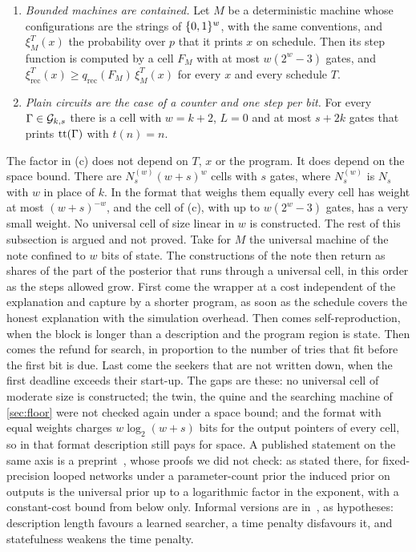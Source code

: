 \begin{proposition}
\begin{enumerate}[label=(\alph*),leftmargin=2em,itemsep=2pt,topsep=2pt]
$s\,T(n)$ on schedule, and it has the same weight for every schedule.
\item \emph{Bounded machines are contained.} Let $M$ be a deterministic machine whose configurations are the
strings of $\{0,1\}^w$, with the same conventions, and $\xi^T_M(x)$ the probability over $p$ that it prints $x$ on
schedule. Then its step function is computed by a cell $F_M$ with at most $w(2^w-3)$ gates, and
$\xi^T_{\mathrm{rec}}(x)\ge q_{\mathrm{rec}}(F_M)\,\xi^T_M(x)$ for every $x$ and every schedule $T$.
\item \emph{Plain circuits are the case of a counter and one step per bit.} For every $\Gamma\in\mathcal G_{k,s}$
there is a cell with $w=k+2$, $L=0$ and at most $s+2k$ gates that prints $\mathrm{tt}(\Gamma)$ with $t(n)=n$.
\end{enumerate}
\end{proposition}

The factor in (c) does not depend on $T$, $x$ or the program. It does depend on the space bound. There are
$N^{(w)}_s(w+s)^w$ cells with $s$ gates, where $N^{(w)}_s$ is $N_s$ with $w$ in place of $k$. In the format
that weighs them equally every cell has weight at most $(w+s)^{-w}$, and the cell of (c), with up to
$w(2^w-3)$ gates, has a very small weight. No universal cell of size linear in $w$ is constructed. The rest of
this subsection is argued and not proved. Take for $M$ the universal machine of the note confined to $w$ bits
of state. The constructions of the note then return as shares of the part of the posterior that runs through a
universal cell, in this order as the steps allowed grow. First come the wrapper at a cost independent of the
explanation and capture by a shorter program, as soon as the schedule covers the honest explanation with the
simulation overhead. Then comes self-reproduction, when the block is longer than a description and the program
region is state. Then comes the refund for search, in proportion to the number of tries that fit before the
first bit is due. Last come the seekers that are not written down, when the first deadline exceeds their
start-up. The gaps are these: no universal cell of moderate size is constructed; the twin, the quine and the
searching machine of \cref{sec:floor} were not checked again under a space bound; and the format with equal
weights charges $w\log_2(w+s)$ bits for the output pointers of every cell, so in that format description still
pays for space. A published statement on the same axis is a preprint~\cite{musat26}, whose proofs we did not
check: as stated there, for fixed-precision looped networks under a parameter-count prior the induced prior on
outputs is the universal prior up to a logarithmic factor in the exponent, with a constant-cost bound from
below only. Informal versions are in~\cite{hubinger19}, as hypotheses: description length favours a learned
searcher, a time penalty disfavours it, and statefulness weakens the time penalty.

